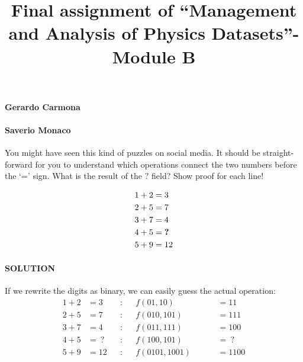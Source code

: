 \documentclass[11pt]{article}
\title{Final assignment of ``Management and Analysis of Physics Datasets''- Module B}
\begin{document}
    
    \maketitle
    
    

\hypertarget{gerardo-carmona}{%
	\paragraph{Gerardo Carmona}\label{gerardo-carmona}}

\hypertarget{saverio-monaco}{%
	\paragraph{Saverio Monaco}\label{saverio-monaco}}

    

You might have seen this kind of puzzles on social media. It should be
straight-forward for you to understand which operations connect the two
numbers before the `=' sign. What is the result of the
\(\boldsymbol{?}\) field? Show proof for each line!

\begin{align*}& 1 + 2 = 3 \\ & 2 + 5 = 7 \\ & 3 + 7 = 4 \\ & 4 + 5 = \space\boldsymbol{?} \\ & 5 + 9 = 12\end{align*}

    \hypertarget{solution}{%
\paragraph{SOLUTION}\label{solution}}

If we rewrite the digits as binary, we can easily guess the actual
operation: 
\begin{align*}
1 + 2 &= 3&&: &&f(01,10)&& &&=11\\
2 + 5 &= 7&&: &&f(010,101)&& &&=111\\
3 + 7 &= 4&&: &&f(011,111)&& &&=100\\
4 + 5 &=\ ?&&: &&f(100,101)&& &&=\ ?\\
5 + 9 &= 12&&: &&f(0101,1001)&& &&=1100
\end{align*}
\end{document}
